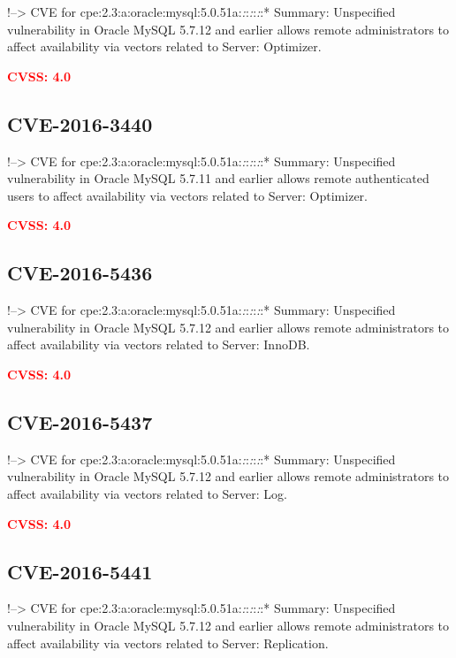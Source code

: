 \documentclass[a4paper, 12pt]{article}
\begin{document}
!--\textgreater{} CVE for
cpe:2.3:a:oracle:mysql:5.0.51a:\emph{:}:\emph{:}:\emph{:}:* Summary:
Unspecified vulnerability in Oracle MySQL 5.7.12 and earlier allows
remote administrators to affect availability via vectors related to
Server: Optimizer.

\textbf{\textcolor{red}{CVSS: 4.0}}

\hypertarget{cve-2016-3440}{%
\subsection{CVE-2016-3440}\label{cve-2016-3440}}

!--\textgreater{} CVE for
cpe:2.3:a:oracle:mysql:5.0.51a:\emph{:}:\emph{:}:\emph{:}:* Summary:
Unspecified vulnerability in Oracle MySQL 5.7.11 and earlier allows
remote authenticated users to affect availability via vectors related to
Server: Optimizer.

\textbf{\textcolor{red}{CVSS: 4.0}}

\hypertarget{cve-2016-5436}{%
\subsection{CVE-2016-5436}\label{cve-2016-5436}}

!--\textgreater{} CVE for
cpe:2.3:a:oracle:mysql:5.0.51a:\emph{:}:\emph{:}:\emph{:}:* Summary:
Unspecified vulnerability in Oracle MySQL 5.7.12 and earlier allows
remote administrators to affect availability via vectors related to
Server: InnoDB.

\textbf{\textcolor{red}{CVSS: 4.0}}

\hypertarget{cve-2016-5437}{%
\subsection{CVE-2016-5437}\label{cve-2016-5437}}

!--\textgreater{} CVE for
cpe:2.3:a:oracle:mysql:5.0.51a:\emph{:}:\emph{:}:\emph{:}:* Summary:
Unspecified vulnerability in Oracle MySQL 5.7.12 and earlier allows
remote administrators to affect availability via vectors related to
Server: Log.

\textbf{\textcolor{red}{CVSS: 4.0}}

\hypertarget{cve-2016-5441}{%
\subsection{CVE-2016-5441}\label{cve-2016-5441}}

!--\textgreater{} CVE for
cpe:2.3:a:oracle:mysql:5.0.51a:\emph{:}:\emph{:}:\emph{:}:* Summary:
Unspecified vulnerability in Oracle MySQL 5.7.12 and earlier allows
remote administrators to affect availability via vectors related to
Server: Replication.
\end{document}
